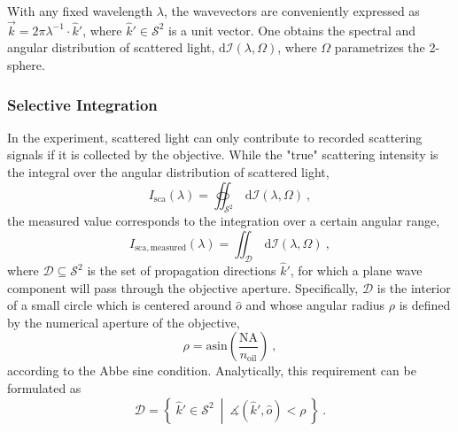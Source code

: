 \documentclass[10pt]{article}
\begin{document}
With any fixed wavelength $\lambda$, the wavevectors are conveniently expressed as $ \vec{k} = 2 \pi \lambda^{-1} \cdot \hat{k}'$, where \mbox{$\hat{k}' \in \mathcal{S}^2$} is a unit vector. 
One obtains the spectral and angular distribution of scattered light, $\mathrm{d}\mathcal{I}(\lambda, \Omega)$, where $\Omega$ parametrizes the 2-sphere. 







\subsubsection*{Selective Integration}


In the experiment, scattered light can only contribute to recorded scattering signals if it is collected by the objective. 
While the "true" scattering intensity is the integral over the angular distribution of scattered light, 
$$
    I_\mathrm{sca}(\lambda) = \oiint_{\mathcal{S}^2} \,\mathrm{d}\mathcal{I}(\lambda, \Omega) \ , %
$$
the measured value corresponds to the integration over a certain angular range, %
$$
    I_\mathrm{sca,measured}(\lambda) = \iint_{\mathcal{D}} \,\mathrm{d}\mathcal{I}(\lambda, \Omega) \ , 
$$
where $\mathcal{D} \subseteq \mathcal{S}^2$ is the set of propagation directions $\hat{k}'$, for which a plane wave component will pass through the objective aperture. %
Specifically, $\mathcal{D}$ is the interior of a small circle which is centered around $\hat{o}$ and whose angular radius $\rho$ is defined by the numerical aperture of the objective, 
$$
    \rho = \mathrm{asin}\!\left( \frac{\mathrm{NA}}{n_\mathrm{oil}} \right) \ ,
$$
according to the Abbe sine condition. \cite{MONA-BFP-photonic-crystals,MONA-BFP-photonic-stop-bands} 
Analytically, this requirement can be formulated as 
$$
    \mathcal{D} = \left\lbrace\ \hat{k}' \in \mathcal{S}^2\ \middle\vert\ \measuredangle\!\left( \hat{k}', \hat{o}\right) < \rho\ \right\rbrace
    \ .
$$
\end{document}
